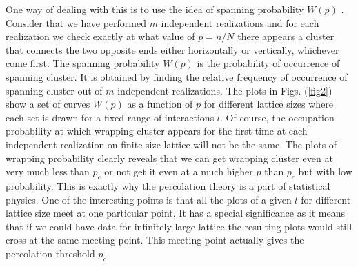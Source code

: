 ﻿\documentclass[twocolumn,showpacs,preprintnumbers,amsmath,amssymb]{revtex4}
\begin{document}
One way of dealing with this is to use the idea of spanning probability $W(p)$ \citep{ref.Ziff_1}.  Consider that we have performed $m$ independent
realizations and for each realization we check exactly at
what value of $p=n/N$ there appears a cluster that connects the two opposite ends either horizontally
or vertically, whichever come first. 
The spanning probability $W(p)$ is the probability of occurrence of spanning cluster. It is obtained by
finding the relative frequency of occurrence of spanning cluster out of $m$ independent realizations. 
The plots in  Figs. (\ref{fig2}) show a set of curves $W(p)$ as a function of $p$ for different lattice sizes
where each set is drawn for a fixed range of interactions $l$. Of course, the occupation probability at which 
wrapping cluster appears for the first time at each independent 
realization on finite size lattice will not be the same. The plots of wrapping probability clearly reveals
that we can get wrapping cluster even at very much less than $p_c$ 
or not get it even at a much higher $p$ than $p_c$ but with low probability.
This is exactly why the percolation theory is a part of statistical physics.   One of the interesting
points is that all the plots of a given $l$ for different lattice size meet at one particular
point. It has a special significance as it means that if we could have data for infinitely large lattice the resulting 
plots would still cross at the same meeting point. This meeting point actually gives
the percolation threshold $p_c$. 
\end{document}
